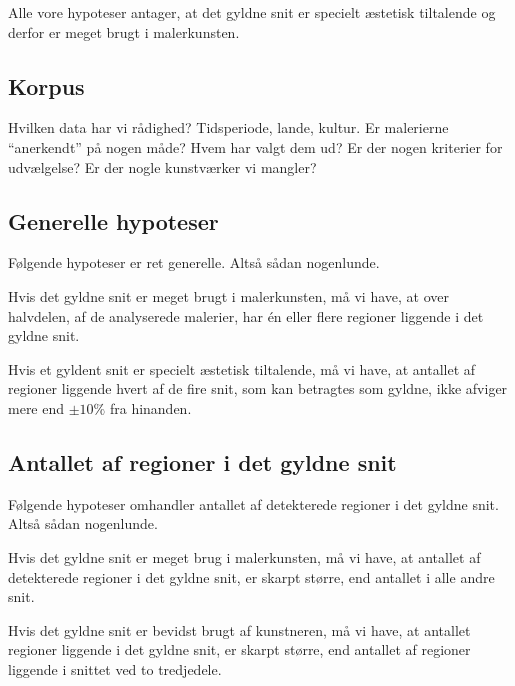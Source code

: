 {
{\sffamily Alle vore hypoteser antager, at det gyldne snit er specielt
æstetisk tiltalende og derfor er meget brugt i malerkunsten.
}

\subsection{Korpus}
Hvilken data har vi rådighed? Tidsperiode, lande, kultur. Er malerierne
``anerkendt'' på nogen måde? Hvem har valgt dem ud? Er der nogen
kriterier for udvælgelse? Er der nogle kunstværker vi mangler?

\subsection{Generelle hypoteser}
Følgende hypoteser er ret generelle. Altså sådan nogenlunde.

\begin{hypotese}
    Hvis det gyldne snit er meget brugt i malerkunsten, må vi have, at
    over halvdelen, af de analyserede malerier, har én eller flere
    regioner liggende i det gyldne snit.
\end{hypotese}

\begin{hypotese}
    Hvis et gyldent snit er specielt æstetisk tiltalende, må vi have, at
    antallet af regioner liggende hvert af de fire snit, som kan
    betragtes som gyldne, ikke afviger mere end $\pm10\%$ fra hinanden.
\end{hypotese}

\subsection{Antallet af regioner i det gyldne snit}
Følgende hypoteser omhandler antallet af detekterede regioner i det
gyldne snit. Altså sådan nogenlunde.

\begin{hypotese}
    Hvis det gyldne snit er meget brug i malerkunsten, må vi have, at
    antallet af detekterede regioner i det gyldne snit, er skarpt
    større, end antallet i alle andre snit.
\end{hypotese}

\begin{hypotese}
    Hvis det gyldne snit er bevidst brugt af kunstneren, må vi have, at
    antallet regioner liggende i det gyldne snit, er skarpt større, end
    antallet af regioner liggende i snittet ved to tredjedele.
\end{hypotese}

}
